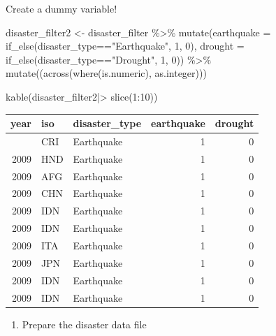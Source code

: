 \documentclass[
  letterpaper,
  DIV=11,
  numbers=noendperiod]{scrartcl}
\newenvironment{Shaded}{\begin{snugshade}}{\end{snugshade}}
\newcommand{\AttributeTok}[1]{\textcolor[rgb]{0.40,0.45,0.13}{#1}}
\newcommand{\DecValTok}[1]{\textcolor[rgb]{0.68,0.00,0.00}{#1}}
\newcommand{\FunctionTok}[1]{\textcolor[rgb]{0.28,0.35,0.67}{#1}}
\newcommand{\NormalTok}[1]{\textcolor[rgb]{0.00,0.23,0.31}{#1}}
\newcommand{\OtherTok}[1]{\textcolor[rgb]{0.00,0.23,0.31}{#1}}
\newcommand{\SpecialCharTok}[1]{\textcolor[rgb]{0.37,0.37,0.37}{#1}}
\newcommand{\StringTok}[1]{\textcolor[rgb]{0.13,0.47,0.30}{#1}}
\newcounter{none} %
\providecommand{\tightlist}{%
  \setlength{\itemsep}{0pt}\setlength{\parskip}{0pt}}
\begin{document}
Create a dummy variable!

\begin{Shaded}
\begin{Highlighting}[]
\NormalTok{disaster\_filter2 }\OtherTok{\textless{}{-}}\NormalTok{ disaster\_filter }\SpecialCharTok{\%\textgreater{}\%} 
    \FunctionTok{mutate}\NormalTok{(}\AttributeTok{earthquake =} \FunctionTok{if\_else}\NormalTok{(disaster\_type}\SpecialCharTok{==}\StringTok{"Earthquake"}\NormalTok{, }\DecValTok{1}\NormalTok{, }\DecValTok{0}\NormalTok{),}
           \AttributeTok{drought =} \FunctionTok{if\_else}\NormalTok{(disaster\_type}\SpecialCharTok{==}\StringTok{"Drought"}\NormalTok{, }\DecValTok{1}\NormalTok{, }\DecValTok{0}\NormalTok{)) }\SpecialCharTok{\%\textgreater{}\%}
                    \FunctionTok{mutate}\NormalTok{((}\FunctionTok{across}\NormalTok{(}\FunctionTok{where}\NormalTok{(is.numeric), as.integer)))}
                                                

\FunctionTok{kable}\NormalTok{(disaster\_filter2}\SpecialCharTok{|\textgreater{}} \FunctionTok{slice}\NormalTok{(}\DecValTok{1}\SpecialCharTok{:}\DecValTok{10}\NormalTok{))}
\end{Highlighting}
\end{Shaded}

{\def\LTcaptype{none} %
\begin{longtable}[]{@{}rllrr@{}}
\toprule\noalign{}
year & iso & disaster\_type & earthquake & drought \\
\midrule\noalign{}
\endhead
\bottomrule\noalign{}
\endlastfoot
2009 & CRI & Earthquake & 1 & 0 \\
2009 & HND & Earthquake & 1 & 0 \\
2009 & AFG & Earthquake & 1 & 0 \\
2009 & CHN & Earthquake & 1 & 0 \\
2009 & IDN & Earthquake & 1 & 0 \\
2009 & IDN & Earthquake & 1 & 0 \\
2009 & ITA & Earthquake & 1 & 0 \\
2009 & JPN & Earthquake & 1 & 0 \\
2009 & IDN & Earthquake & 1 & 0 \\
2009 & IDN & Earthquake & 1 & 0 \\
\end{longtable}
}

\begin{enumerate}
\def\labelenumi{\arabic{enumi}.}
\setcounter{enumi}{2}
\tightlist
\item
  Prepare the disaster data file
\end{enumerate}
\end{document}
